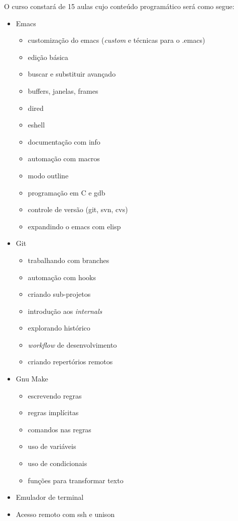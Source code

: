 \documentclass[12pt,brazil]{article}
\begin{document}
O curso constará de 15 aulas cujo conteúdo programático será como
segue:

\begin{itemize}
\item Emacs
  \begin{itemize}
  \item customização do emacs (\textit{custom} e técnicas para o .emacs)
  \item edição básica
  \item buscar e substituir avançado
  \item buffers, janelas, frames
  \item dired
  \item eshell
  \item documentação com info
  \item automação com macros
  \item modo outline
  \item programação em C e gdb
  \item controle de versão (git, svn, cvs)
  \item expandindo o emacs com elisp
  \end{itemize} 
\item Git
  \begin{itemize}
  \item trabalhando com branches
  \item automação com hooks
  \item criando sub-projetos
  \item introdução aos \textit{internals}
  \item explorando histórico
  \item \textit{workflow} de desenvolvimento
  \item criando repertórios remotos
  \end{itemize}
\item Gnu Make
  \begin{itemize}
  \item escrevendo regras
  \item regras implícitas
  \item comandos nas regras
  \item uso de variáveis
  \item uso de condicionais
  \item funções para transformar texto
  \end{itemize}
\item Emulador de terminal
\item Acesso remoto com ssh e unison
\end{itemize}
  
\end{document}
